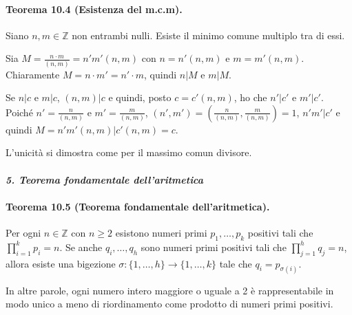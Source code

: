 \documentclass[12pt, a4paper]{report}
\theoremstyle{definition}
\newcommand{\Z}{\mathbb{Z}}
\begin{document}
\paragraph{Teorema 10.4 (Esistenza del m.c.m).}
Siano $n,m\in\Z$ non entrambi nulli. Esiste il minimo comune multiplo tra di essi.
\begin{demonstration}
    Sia $M=\frac{n\cdot m}{(n,m)}=n'm'(n,m)$ con $n=n'(n,m)$ e $m=m'(n,m)$.
    Chiaramente $M=n\cdot m'=n'\cdot m$, quindi $n|M$ e $m|M$.
    
    Se $n|c$ e $m|c$, $(n,m)|c$ e quindi, posto $c=c'(n,m)$, ho che $n'|c'$ e
    $m'|c'$. Poiché $n'=\frac{n}{(n,m)}$ e $m'=\frac{m}{(n,m)}$, $(n',m')=\left(
    \frac{n}{(n,m)},\frac{m}{(n,m)}\right)=1$, $n'm'|c'$ e quindi $M=n'm'(n,m)|c'
    (n,m)=c$.
\end{demonstration}
\noindent
L'unicità si dimostra come per il massimo comun divisore.

\paragraph{\emph{5. Teorema fondamentale dell'aritmetica}}
\paragraph{Teorema 10.5 (Teorema fondamentale dell'aritmetica).}
Per ogni $n\in\Z$ con $n\geq 2$ esistono numeri primi $p_1,\dots,p_k$ positivi
tali che $\prod_{i=1}^kp_i=n$. Se anche $q_i,\dots,q_h$ sono numeri primi
positivi tali che $\prod_{j=1}^{h}q_j=n$, allora esiste una bigezione $\sigma:
\{1,\dots,h\}\to\{1,\dots,k\}$ tale che $q_i=p_{\sigma(i)}$.

In altre parole, ogni numero intero maggiore o uguale a 2 è rappresentabile in
modo unico a meno di riordinamento come prodotto di numeri primi positivi.
\end{document}
